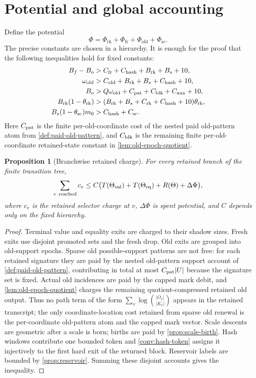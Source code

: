 \documentclass[11pt]{article}
\newcommand{\Cref}[1]{\ref{#1}}
\newtheorem{proposition}[theorem]{Proposition}
\theoremstyle{remark}
\newcommand{\old}{\mathrm{old}}
\newcommand{\fr}{\mathrm{fr}}
\newcommand{\scal}{\mathrm{sc}}
\newcommand{\rk}{\mathrm{rk}}
\begin{document}
\section{Potential and global accounting}

Define the potential
\[
        \Phi=\Phi_{\rk}+\Phi_{\fr}+\Phi_{\old}+\Phi_{\scal}.
\]
The precise constants are chosen in a hierarchy.  It is enough for the proof that the following inequalities hold for fixed constants:
\begin{align*}
        B_f-B_o &> C_{\fr}+C_{\rm hash}+B_{\rk}+B_s+10,\\
        \omega_{\old} &> C_{\old}+B_{\rk}+B_s+C_{\rm hash}+10,\\
        B_o &> Q\omega_{\old}+C_{\rm pat}+C_{\rm blk}+C_{\rm aux}+10,\\
        B_{\rk}(1-\theta_{\rk}) &> (B_{\rk}+B_s+C_{\rk}+C_{\rm hash}+10)\theta_{\rk},\\
        B_s(1-\theta_{\scal})m_0 &> C_{\rm hash}+C_{\scal}.
\end{align*}
Here $C_{\rm pat}$ is the finite per-old-coordinate cost of the nested paid old-pattern atom from \Cref{def:paid-old-pattern}, and $C_{\rm blk}$ is the remaining finite per-old-coordinate retained-state constant in \Cref{lem:old-epoch-quotient}.

\begin{proposition}[Branchwise retained charge]\label{prop:branch-charge}
For every retained branch of the finite transition tree,
\[
        \sum_{v\ {\rm reached}} c_v
        \le C\bigl(T(\Theta_{\rm val})+T(\Theta_{\rm eq})+R(\Theta)+\Delta\Phi\bigr),
\]
where $c_v$ is the retained selector charge at $v$, $\Delta\Phi$ is spent potential, and $C$ depends only on the fixed hierarchy.
\end{proposition}

\begin{proof}
Terminal value and equality exits are charged to their shadow sizes.  Fresh exits use disjoint promoted sets and the fresh drop.  Old exits are grouped into old-support epochs.  Sparse old possible-support patterns are not free: for each retained signature they are paid by the nested old-pattern support account of \Cref{def:paid-old-pattern}, contributing in total at most $C_{\rm pat}|U|$ because the signature set is fixed.  Actual old incidences are paid by the capped mark debit, and \Cref{lem:old-epoch-quotient} charges the remaining quotient-compressed retained old output.  Thus no path term of the form $\sum_v \log\binom{|O_v|}{|K_v|}$ appears in the retained transcript; the only coordinate-location cost retained from sparse old renewal is the per-coordinate old-pattern atom and the capped mark vector.  Scale descents are geometric after a scale is born; births are paid by \Cref{prop:scale-birth}.  Hash windows contribute one bounded token and \Cref{conv:hash-token} assigns it injectively to the first hard exit of the returned block.  Reservoir labels are bounded by \Cref{prop:reservoir}.  Summing these disjoint accounts gives the inequality.
\end{proof}
\end{document}
